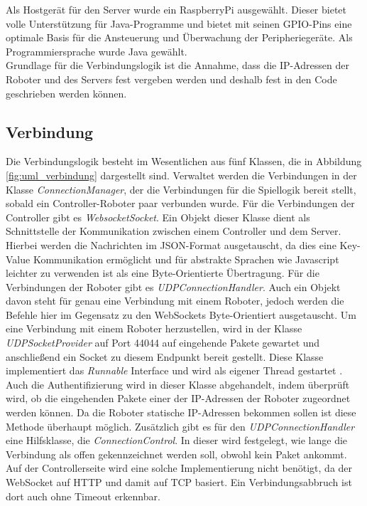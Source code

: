 Als Hostgerät für den Server wurde ein RaspberryPi ausgewählt. Dieser bietet volle Unterstützung für Java-Programme und bietet mit seinen GPIO-Pins eine optimale Basis für die Ansteuerung und Überwachung der Peripheriegeräte. 
Als Programmiersprache wurde Java gewählt.\\
Grundlage für die Verbindungslogik ist die Annahme, dass die IP-Adressen der Roboter und des Servers fest vergeben werden und deshalb fest in den Code geschrieben werden können.


\subsection{Verbindung}
Die Verbindungslogik besteht im Wesentlichen aus fünf Klassen, die in Abbildung \ref{fig:uml_verbindung} dargestellt sind. Verwaltet werden die Verbindungen in der Klasse \textit{ConnectionManager}, der die Verbindungen für die Spiellogik bereit stellt, sobald ein Controller-Roboter paar verbunden wurde. Für die Verbindungen der Controller gibt es \textit{WebsocketSocket}. Ein Objekt dieser Klasse dient als Schnittstelle der Kommunikation zwischen einem Controller und dem Server. Hierbei werden die Nachrichten im JSON-Format ausgetauscht, da dies eine Key-Value Kommunikation ermöglicht und für abstrakte Sprachen wie Javascript leichter zu verwenden ist als eine Byte-Orientierte Übertragung. Für die Verbindungen der Roboter gibt es \textit{UDPConnectionHandler}. Auch ein Objekt davon steht für genau eine Verbindung mit einem Roboter, jedoch werden die Befehle hier im Gegensatz zu den WebSockets Byte-Orientiert ausgetauscht. Um eine Verbindung mit einem Roboter herzustellen, wird in der Klasse \textit{UDPSocketProvider} auf Port 44044 auf eingehende Pakete gewartet und anschließend ein Socket zu diesem Endpunkt bereit gestellt. Diese Klasse implementiert das \textit{Runnable} Interface und wird als eigener Thread gestartet \cite{PROJEKT}.  Auch die Authentifizierung wird in dieser Klasse abgehandelt, indem überprüft wird, ob die eingehenden Pakete einer der IP-Adressen der Roboter zugeordnet werden können. Da die Roboter statische IP-Adressen bekommen sollen ist diese Methode überhaupt möglich. Zusätzlich gibt es für den \textit{UDPConnectionHandler} eine Hilfsklasse, die \textit{ConnectionControl}. In dieser wird festgelegt, wie lange die Verbindung als offen gekennzeichnet werden soll, obwohl kein Paket ankommt. Auf der Controllerseite wird eine solche Implementierung nicht benötigt, da der WebSocket auf HTTP und damit auf TCP basiert. Ein Verbindungsabbruch ist dort auch ohne Timeout erkennbar.


